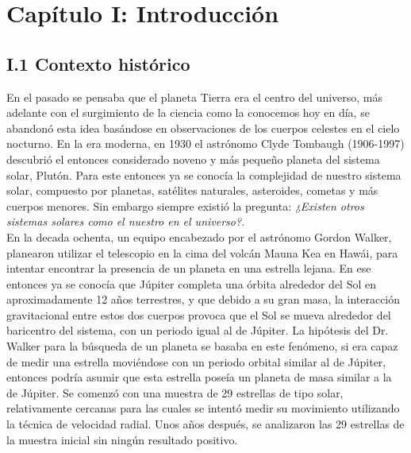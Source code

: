 \chapter*{\textbf{Capítulo I: Introducción}}
\setcounter{chapter}{1}
\setcounter{equation}{0}
\setcounter{figure}{0}
\setcounter{table}{0}

\section*{I.1 Contexto histórico}

En el pasado se pensaba que el planeta Tierra era el centro del universo, más adelante con el surgimiento de la ciencia como la conocemos hoy en día, se abandonó esta idea basándose en observaciones de los cuerpos celestes en el cielo nocturno. En la era moderna, en 1930 el astrónomo Clyde Tombaugh (1906-1997) descubrió el entonces considerado noveno y más pequeño planeta del sistema solar, Plutón. Para este entonces ya se conocía la complejidad de nuestro sistema solar, compuesto por planetas, satélites naturales, asteroides, cometas y más cuerpos menores. Sin embargo siempre existió la pregunta: \textit{¿Existen otros sistemas solares como el nuestro en el universo?}.\\

En la decada ochenta, un equipo encabezado por el astrónomo Gordon Walker, planearon utilizar el telescopio en la cima del volcán Mauna Kea en Hawái, para intentar encontrar la presencia de un planeta en una estrella lejana. En ese entonces ya se conocía que Júpiter completa una órbita alrededor del Sol en aproximadamente 12 años terrestres, y que debido a su gran masa, la interacción gravitacional entre estos dos cuerpos provoca que el Sol se mueva alrededor del baricentro del sistema, con un periodo igual al de Júpiter. La hipótesis del Dr. Walker para la búsqueda de un planeta se basaba en este fenómeno, si era capaz de medir una estrella moviéndose con un periodo orbital similar al de Júpiter, entonces podría asumir que esta estrella poseía un planeta de masa similar a la de Júpiter. Se comenzó con una muestra de 29 estrellas de tipo solar, relativamente cercanas para las cuales se intentó medir su movimiento utilizando la técnica de velocidad radial. Unos años después, se analizaron las 29 estrellas de la muestra inicial sin ningún resultado positivo.\\ 

